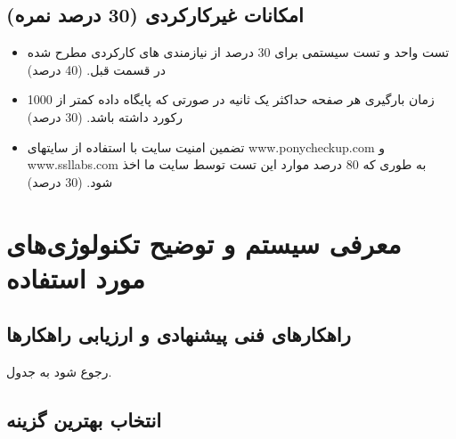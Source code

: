 \documentclass{article}
\begin{document}
\subsection{  امکانات غیرکارکردی (30 درصد نمره)}
\begin{itemize}
\item
تست واحد و تست سیستمی برای 30 درصد از نیازمندی های کارکردی مطرح شده در قسمت قبل. (40 درصد)
\item
زمان بارگیری هر صفحه حداکثر یک ثانیه در صورتی که پایگاه داده کمتر از 1000 رکورد داشته باشد. (30 درصد)
\item
تضمین امنیت سایت با استفاده از سایتهای www.ponycheckup.com و www.ssllabs.com به طوری که 80 درصد موارد این تست توسط سایت ما اخذ شود. (30 درصد)
\end{itemize}
\section{معرفی سیستم و توضیح تکنولوژی‌های مورد استفاده}
\subsection{راهکارهای فنی پیشنهادی و ارزیابی راهکارها}
رجوع شود به جدول.

\subsection{انتخاب بهترین گزینه}
\end{document}
